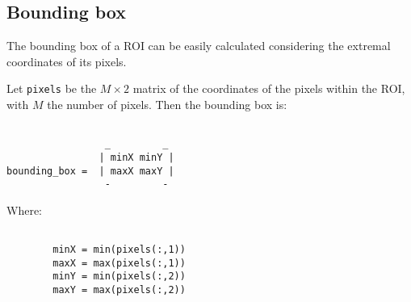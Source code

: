     \subsection{Bounding box}\label{subsection:bounding_box}
        \par{
            The bounding box of a ROI can be easily calculated considering the extremal coordinates of its pixels.
        }
        \par{
            Let \texttt{pixels} be the $M \times 2$ matrix of the coordinates of the pixels within the ROI, with $M$ the number of pixels. Then the bounding box is: 
        }
        \par{
            \begin{BVerbatim}

                 _         _         
                | minX minY |
bounding_box =  | maxX maxY |
                 -         - 
            \end{BVerbatim}
        }
        \par{
            Where:
        }
        \par{
            \begin{BVerbatim} 

        minX = min(pixels(:,1))
        maxX = max(pixels(:,1))
        minY = min(pixels(:,2))
        maxY = max(pixels(:,2))
   
            \end{BVerbatim}
        }



